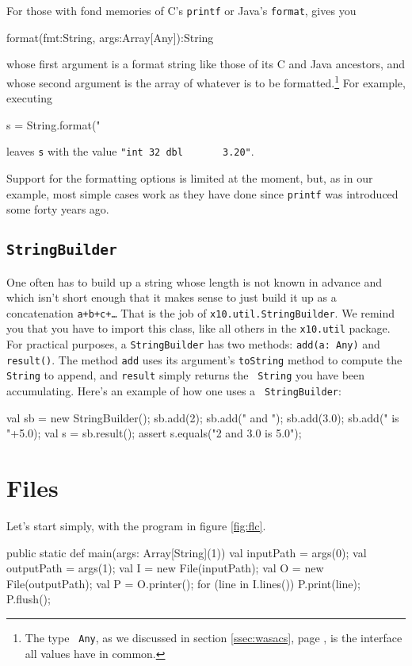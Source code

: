 For those with fond memories of C's {\tt printf} or Java's {\tt format}, \Xten{}
gives you
\begin{xten}
format(fmt:String, args:Array[Any]):String
\end{xten}
whose first
argument is a format string like those of its C and Java ancestors, and whose
second argument is the array of whatever is to be formatted.\footnote{The type {\tt
Any}, as we discussed in section \ref{ssec:wasacs}, page \pageref{ssec:wasacs},
is the interface all values have in common.}  For example, executing
\begin{xten}
s = String.format("%
\end{xten}
leaves {\tt s} with the value {\tt "int 32 dbl\ \ \ \ \ \ \ 3.20"}.

Support for the formatting options is limited at the moment, but, as in our
example, most simple cases work as they have done since {\tt printf} was
introduced some forty years ago.

\subsection{\tt StringBuilder} One often has to build up a string whose
length is not known in advance and which isn't short enough that it makes
sense to just build it up as a concatenation {\tt a+b+c+\ldots}
That is the job of {\tt x10.util.StringBuilder}. We remind you that you have to
import this class, like all others in the {\tt x10.util} package.  For
practical purposes, a {\tt StringBuilder} has two methods: {\tt add(a: Any)} and
{\tt result()}.  The method {\tt add} uses its argument's {\tt toString} method
to compute the {\tt String} to append, and {\tt result} simply returns the {\tt
String} you have been accumulating. Here's an example of how one uses a {\tt
StringBuilder}:
\begin{xtennum}[]
val sb = new StringBuilder();
sb.add(2);
sb.add(" and ");
sb.add(3.0);
sb.add(" is "+5.0);
val s = sb.result();
assert s.equals("2 and 3.0 is 5.0");
\end{xtennum}


\section{Files}\label{sec:files}
Let's start simply, with the program in figure \ref{fig:flc}.  
\begin{xtennum}[frame=tb, caption={A simple line-reading file copier},label={fig:flc},float=tb]
public static def main(args: Array[String](1)) {
   val inputPath  = args(0);
   val outputPath = args(1);
   val I = new File(inputPath); 
   val O = new File(outputPath); 
   val P = O.printer(); 
   for (line in I.lines()) {
      P.print(line);
   }
   P.flush();
}
\end{xtennum}



